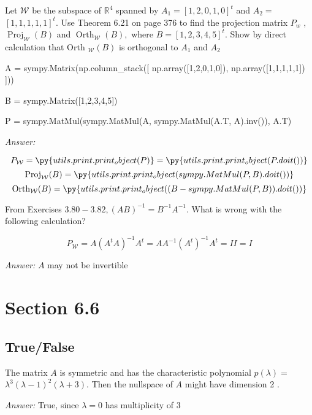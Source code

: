 \documentclass[letterpaper]{article}
\newcommand{\ans}{\textit{Answer: }}
\newenvironment{question}[2][Question]{\begin{trivlist}
\item[\hskip \labelsep {\bfseries #1}\hskip \labelsep {\bfseries #2.}]}{\end{trivlist}}
\newcommand{\printobj}[1]{\py{utils.print.print_object(#1)}}
\begin{document}
\begin{question}{6.95}
  Let $\mathcal{W}$ be the subspace of $\mathbb{R}^{4}$ spanned by $A_{1}=[1,2,0,1,0]^{t}$ and $A_{2}=$
  $[1,1,1,1,1]^{t} .$ Use Theorem 6.21 on page 376 to find the projection matrix $P_{w}$ ,
  $\operatorname{Proj}_{\mathcal{W}}(B)$ and $\operatorname{Orth}_{\mathcal{W}}(B),$ where $B=[1,2,3,4,5]^{t} .$ Show by direct calculation
  that Orth $_{\mathcal{W}}(B)$ is orthogonal to $A_{1}$ and $A_{2}$

  \begin{pycode}
A = sympy.Matrix(np.column_stack([
    np.array([1,2,0,1,0]),
    np.array([1,1,1,1,1])
  ]))

B = sympy.Matrix([1,2,3,4,5])

P = sympy.MatMul(sympy.MatMul(A, sympy.MatMul(A.T, A).inv()), A.T)
  \end{pycode}

  \ans 

  $$P_{\mathcal{W}} = \printobj{P} = \printobj{P.doit()}$$
  $$\operatorname{Proj}_{\mathcal{W}}(B) = \printobj{sympy.MatMul(P, B).doit()}$$
  $$\operatorname{Orth}_{\mathcal{W}}(B) = \printobj{(B - sympy.MatMul(P, B)).doit()}$$
\end{question}

\begin{question}{6.100}
  From Exercises $3.80-3.82,(A B)^{-1}=B^{-1} A^{-1} .$ What is wrong with the
  following calculation?
  
  $$
  P_{\mathcal{W}}=A\left(A^{t} A\right)^{-1} A^{t}=A A^{-1}\left(A^{t}\right)^{-1} A^{t}=I I=I
  $$

  \ans $A$ may not be invertible
\end{question}

\section{Section 6.6}
\subsection{True/False}

\begin{question}{6.24}
  The matrix $A$ is symmetric and has the characteristic polynomial $p(\lambda)=$
  $\lambda^{3}(\lambda-1)^{2}(\lambda+3) .$ Then the nullspace of $A$ might have dimension 2 .

  \ans True, since $\lambda = 0$ has multiplicity of 3
\end{question}
\end{document}
